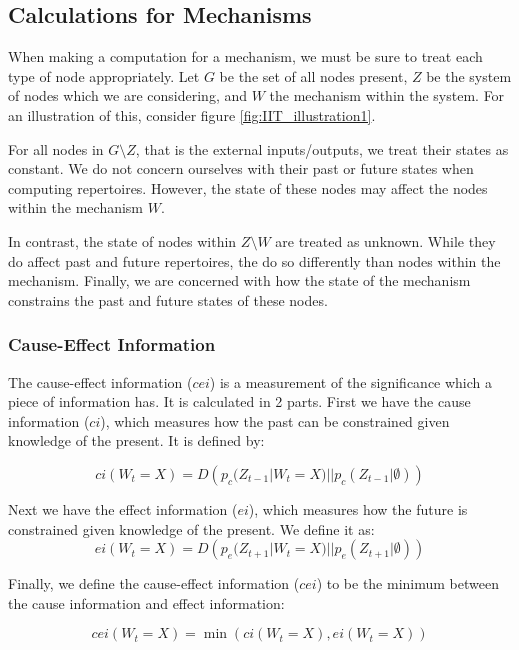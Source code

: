 \subsection{Calculations for Mechanisms}\label{sec:little_phi}
When making a computation for a mechanism, we must be sure to treat each type of node appropriately. Let $G$ be the set of all nodes present, $Z$ be the system of nodes which we are considering, and $W$ the mechanism within the system. For an illustration of this, consider figure \ref{fig:IIT_illustration1}.

For all nodes in $G\setminus Z$, that is the external inputs/outputs, we treat their states as constant. We do not concern ourselves with their past or future states when computing repertoires. However, the state of these nodes may affect the nodes within the mechanism $W$.

In contrast, the state of nodes within $Z \setminus W$ are treated as unknown. While they do affect past and future repertoires, the do so differently than nodes within the mechanism. Finally, we are concerned with how the state of the mechanism constrains the past and future states of these nodes.

\subsubsection{Cause-Effect Information}
The cause-effect information ($cei$) is a measurement of the significance which a piece of information has. It is calculated in 2 parts. First we have the cause information ($ci$), which measures how the past can be constrained given knowledge of the present. It is defined by:

\begin{equation}
\label{def:ci}
ci(W_{t} = X) = D\left(p_c(Z_{t-1}|W_{t} = X)||p_c(Z_{t-1}|\emptyset)\right)
\end{equation}


Next we have the effect information ($ei$), which measures how the future is constrained given knowledge of the present. We define it as:
\begin{equation}
\label{def:ei}
ei(W_{t} = X) = D\left(p_e(Z_{t+1}|W_{t} = X)||p_{e}(Z_{t+1}|\emptyset)\right)
\end{equation}

Finally, we define the cause-effect information ($cei$) to be the minimum between the cause information and effect information:

\begin{equation}
\label{def:cei}
cei(W_{t} = X) = \min\left(ci(W_{t} = X), ei(W_{t} = X) \right)
\end{equation}

